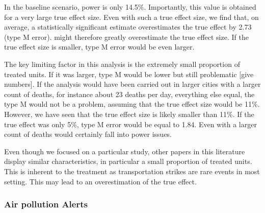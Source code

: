 \documentclass[12pt]{article}
\begin{document}
            In the baseline scenario, power is only 14.5\%. Importantly, this value is obtained for a very large true effect size. Even with such a true effect size, we find that, on average, a statistically significant estimate overestimates the true effect by 2.73 (type M error). \citeauthor{bauernschuster_when_2017} might therefore greatly overestimate the true effect size. If the true effect size is smaller, type M error would be even larger.
            
            The key limiting factor in this analysis is the extremely small proportion of treated units. If it was larger, type M would be lower but still problematic [give numbers]. If the analysis would have been carried out in larger cities with a larger count of deaths, for instance about 23 deaths per day, everything else equal, the type M would not be a problem, assuming that the true effect size would be 11\%. However, we have seen that the true effect size is likely smaller than 11\%. If the true effect was only 5\%, type M error would be equal to 1.84. Even with a larger count of deaths \citeauthor{bauernschuster_when_2017} would certainly fall into power issues.
            
            Even though we focused on a particular study, other papers in this literature display similar characteristics, in particular a small proportion of treated units. This is inherent to the treatment as transportation strikes are rare events in most setting. This may lead to an overestimation of the true effect. 
        
        \subsubsection{Air pollution Alerts}
        
\end{document}
